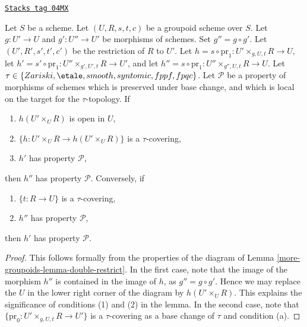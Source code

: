 \begin{lemma}
\label{more-groupoids-lemma-double-restrict-property}
\href{https://stacks.math.columbia.edu/tag/04MX}{\texttt{Stacks tag 04MX}}

Let $S$ be a scheme.
Let $(U, R, s, t, c)$ be a groupoid scheme over $S$.
Let $g : U' \to U$ and $g' : U'' \to U'$ be morphisms of schemes.
Set $g'' = g \circ g'$.
Let $(U', R', s', t', c')$ be the restriction of $R$ to $U'$.
Let $h = s \circ \text{pr}_1 : U' \times_{g, U, t} R \to U$,
let $h' = s' \circ \text{pr}_1 : U'' \times_{g', U', t} R \to U'$, and
let $h'' = s \circ \text{pr}_1 : U'' \times_{g'', U, t} R \to U$.
Let $\tau \in \{Zariski, \linebreak[0] \etale, \linebreak[0]
smooth, \linebreak[0] syntomic, \linebreak[0] fppf, \linebreak[0] fpqc\}$. Let
$\mathcal{P}$ be a property of morphisms of schemes
which is preserved under base change, and which
is local on the target for the $\tau$-topology. If
\begin{enumerate}
\item $h(U' \times_U R)$ is open in $U$,
\item $\{h : U' \times_U R \to h(U' \times_U R)\}$ is a $\tau$-covering,
\item $h'$ has property $\mathcal{P}$,
\end{enumerate}
then $h''$ has property $\mathcal{P}$. Conversely, if
\begin{enumerate}
\item[(a)] $\{t : R \to U\}$ is a $\tau$-covering,
\item[(d)] $h''$ has property $\mathcal{P}$,
\end{enumerate}
then $h'$ has property $\mathcal{P}$.
\end{lemma}

\begin{proof}
This follows formally from the properties of the diagram of
Lemma \ref{more-groupoids-lemma-double-restrict}.
In the first case, note that the image of the morphism
$h''$ is contained in the image of $h$, as $g'' = g \circ g'$.
Hence we may replace the $U$ in the lower right corner of the
diagram by $h(U' \times_U R)$. This explains the significance of
conditions (1) and (2) in the lemma. In the second case, note that
$\{\text{pr}_0 : U' \times_{g, U, t} R \to U'\}$ is a $\tau$-covering
as a base change of $\tau$ and condition (a).
\end{proof}

